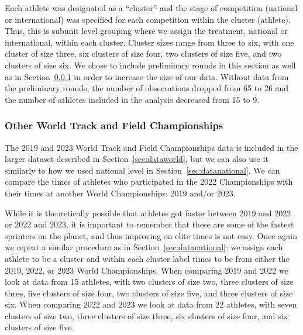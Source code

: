 \documentclass[12pt, letterpaper]{article}
\begin{document}
Each athlete was designated as a ``cluster'' and the stage of competition (national
or international) was specified for each competition within the cluster (athlete).
Thus, this is subunit level grouping where we assign the treatment, national or
international, within each cluster. Cluster sizes range from three to six, with
one cluster of size three, six clusters of size four, two clusters of size five,
and two clusters of size six. We chose to include preliminary rounds in this
section as well as in Section~\ref{sec:data2019} in order to increase the size 
of our data. Without data from the preliminary rounds, the number of observations
dropped from 65 to 26 and the number of athletes included in the analysis
decreased from 15 to 9.


\subsubsection{Other World Track and Field Championships}\label{sec:data2019}
The 2019 and 2023 World Track and Field Championships data is included in the 
larger dataset described in Section~\ref{sec:dataworld}, but we can also use it
similarly to how we used national level in Section~\ref{sec:datanational}. We
can compare the times of athletes who participated in the 2022 Championships with
their times at another World Championships: 2019 and/or 2023.


While it is theoretically possible that athletes got faster 
between 2019 and 2022 or 2022 and 2023, it is important to 
remember that these are some of the fastest sprinters on the planet, and thus
improving on elite times is not easy. Once again we repeat a similar procedure
as in Section~\ref{sec:datanational}; we assign each athlete to be a cluster and
within each cluster label times to be from either the 2019, 2022, or 2023 World
Championships. When comparing 2019 and 2022 we look at data from 15
athletes, with two clusters of size two, three clusters of size three, five 
clusters of size four, two clusters of size five, and three clusters of size six.
When comparing 2022 and 2023 we look at data from 22 athletes, with seven 
clusters of size two, three clusters of size three, six clusters of size four,
and six clusters of size five.
\end{document}

